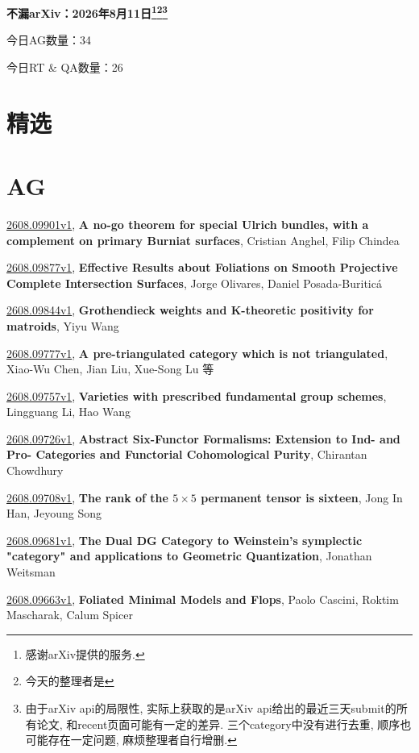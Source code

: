 \documentclass[9pt, a4paper]{article}
\theoremstyle{plain}
\theoremstyle{definition}
\theoremstyle{remark}
\newcommand{\arxiv}[3]{\href{https://arxiv.org/abs/#1}{#1}, \textbf{\textcolor{arxivblue}{#2}}, #3}
\newcommand{\AGnumber}{34}
\newcommand{\RTQAnumber}{26}
\newcommand{\NewestDate}{2026年8月11日}
\newcommand{\todayarXiver}{} %
\begin{document}
\begin{center}
    \Huge\textbf{不漏arXiv：\NewestDate\footnote{感谢arXiv提供的服务.}\footnote{今天的整理者是\todayarXiver}\footnote{由于arXiv api的局限性, 实际上获取的是arXiv api给出的最近三天submit的所有论文, 和recent页面可能有一定的差异. 三个category中没有进行去重, 顺序也可能存在一定问题, 麻烦整理者自行增删.}} \\
\end{center}

\setcounter{section}{-1}

\begin{center}
    今日AG数量：\AGnumber
    
    今日RT \& QA数量：\RTQAnumber
    
\end{center}


\section{精选}


\section{AG}
\arxiv{2608.09901v1}{A no-go theorem for special Ulrich bundles, with a complement on primary Burniat surfaces}{Cristian Anghel, Filip Chindea}

\arxiv{2608.09877v1}{Effective Results about Foliations on Smooth Projective Complete Intersection Surfaces}{Jorge Olivares, Daniel Posada-Buriticá}

\arxiv{2608.09844v1}{Grothendieck weights and K-theoretic positivity for matroids}{Yiyu Wang}

\arxiv{2608.09777v1}{A pre-triangulated category which is not triangulated}{Xiao-Wu Chen, Jian Liu, Xue-Song Lu 等}

\arxiv{2608.09757v1}{Varieties with prescribed fundamental group schemes}{Lingguang Li, Hao Wang}

\arxiv{2608.09726v1}{Abstract Six-Functor Formalisms: Extension to Ind- and Pro- Categories and Functorial Cohomological Purity}{Chirantan Chowdhury}

\arxiv{2608.09708v1}{The rank of the $5\times 5$ permanent tensor is sixteen}{Jong In Han, Jeyoung Song}

\arxiv{2608.09681v1}{The Dual DG Category to Weinstein's symplectic "category" and applications to Geometric Quantization}{Jonathan Weitsman}

\arxiv{2608.09663v1}{Foliated Minimal Models and Flops}{Paolo Cascini, Roktim Mascharak, Calum Spicer}
\end{document}
